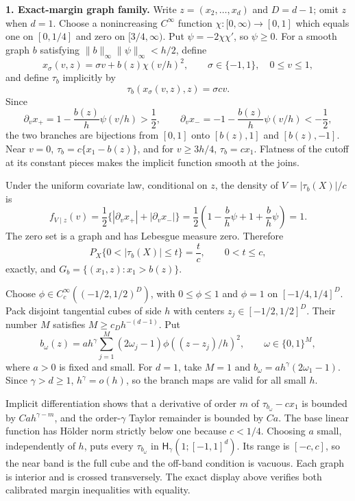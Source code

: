 \textbf{1. Exact-margin graph family.} Write \(z=(x_2,\ldots,x_d)\) and \(D=d-1\); omit \(z\) when \(d=1\). Choose a nonincreasing \(C^\infty\) function \(\chi:[0,\infty)\to[0,1]\) which equals one on \([0,1/4]\) and zero on \([3/4,\infty)\). Put \(\psi=-2\chi\chi'\), so \(\psi\ge0\). For a smooth graph \(b\) satisfying \(\|b\|_\infty\|\psi\|_\infty<h/2\), define
\[
 x_\sigma(v,z)=\sigma v+b(z)\chi(v/h)^2,
 \qquad \sigma\in\{-1,1\},\quad0\le v\le1,
\]
and define \(\tau_b\) implicitly by
\[
 \tau_b(x_\sigma(v,z),z)=\sigma cv.
\]
Since
\[
 \partial_vx_+=1-\frac{b(z)}h\psi(v/h)>\frac12,
 \qquad
 \partial_vx_-=-1-\frac{b(z)}h\psi(v/h)<-\frac12,
\]
the two branches are bijections from \([0,1]\) onto \([b(z),1]\) and \([b(z),-1]\). Near \(v=0\), \(\tau_b=c\{x_1-b(z)\}\), and for \(v\ge3h/4\), \(\tau_b=cx_1\). Flatness of the cutoff at its constant pieces makes the implicit function smooth at the joins.

Under the uniform covariate law, conditional on \(z\), the density of \(V=|\tau_b(X)|/c\) is
\[
 f_{V\mid z}(v)=\frac12\{|\partial_vx_+|+|\partial_vx_-|\}
 =\frac12\left(1-\frac bh\psi+1+\frac bh\psi\right)=1.
\]
The zero set is a graph and has Lebesgue measure zero. Therefore
\[
 P_X\{0<|\tau_b(X)|\le t\}=\frac tc,
 \qquad0<t\le c,
\]
exactly, and \(G_b=\{(x_1,z):x_1>b(z)\}\).

Choose \(\phi\in C_c^\infty((-1/2,1/2)^D)\), with \(0\le\phi\le1\) and \(\phi=1\) on \([-1/4,1/4]^D\). Pack disjoint tangential cubes of side \(h\) with centers \(z_j\in[-1/2,1/2]^D\). Their number \(M\) satisfies \(M\ge c_Dh^{-(d-1)}\). Put
\[
 b_\omega(z)=a h^\gamma\sum_{j=1}^M(2\omega_j-1)\phi((z-z_j)/h)^2,
 \qquad \omega\in\{0,1\}^M,
\]
where \(a>0\) is fixed and small. For \(d=1\), take \(M=1\) and \(b_\omega=ah^\gamma(2\omega_1-1)\). Since \(\gamma>d\ge1\), \(h^\gamma=o(h)\), so the branch maps are valid for all small \(h\).

Implicit differentiation shows that a derivative of order \(m\) of \(\tau_{b_\omega}-cx_1\) is bounded by \(Ca h^{\gamma-m}\), and the order-\(\gamma\) Taylor remainder is bounded by \(Ca\). The base linear function has Hölder norm strictly below one because \(c<1/4\). Choosing \(a\) small, independently of \(h\), puts every \(\tau_{b_\omega}\) in \(\mathsf H_\gamma(1;[-1,1]^d)\). Its range is \([-c,c]\), so the near band is the full cube and the off-band condition is vacuous. Each graph is interior and is crossed transversely. The exact display above verifies both calibrated margin inequalities with equality.

